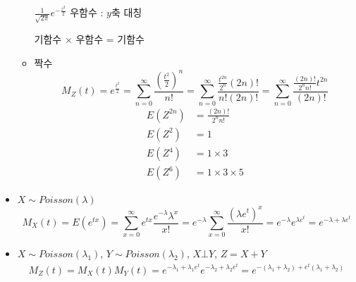 \documentclass{oblivoir}
\begin{document}
\begin{itemize}
\begin{itemize}
$\frac{1}{\sqrt{2\pi}} e^{-\frac{z^2}{2}}$ 우함수 : $y$축 대칭

기함수 $\times$ 우함수 = 기함수
\item 짝수
$$
M_Z(t) = e^{\frac{t^2}{2}} = \sum_{n=0}^{\infty} \frac{(\frac{t^2}{2})^n}{n!} = \sum_{n=0}^{\infty} \frac{\frac{t^{2n}}{2^n} (2n)!}{n!(2n)!} = \sum_{n=0}^{\infty} \frac{\frac{(2n)!}{2^nn!}t^{2n}}{(2n)!}
$$
\begin{align*}
E(Z^{2n}) &= \frac{(2n)!}{2^n n!} \\
E(Z^2) & = 1 \\
E(Z^4) & = 1 \times 3 \\
E(Z^6) & = 1 \times 3 \times 5
\end{align*}
\end{itemize}
\item $X \sim Poisson(\lambda)$
$$
M_X(t) = E(e^{tx}) = \sum_{x=0}^{\infty} e^{tx} \frac{e^{-\lambda} \lambda^x}{x!} = 
e^{-\lambda}\sum_{x=0}^{\infty} \frac{ (\lambda e^{t})^x}{x!} =
e^{-\lambda} e^{\lambda e^t} = e^{-\lambda + \lambda e^t}
$$
\item $X \sim Poisson(\lambda_1)$, $Y \sim Poisson(\lambda_2)$, $X \bot Y$, $Z = X + Y$
\begin{align*}
M_Z(t) = M_X(t) M_Y(t) = e^{-\lambda_1 + \lambda_1 e^t} e^{-\lambda_2 + \lambda_2 e^t} = e^{-(\lambda_1 + \lambda_2) + e^t (\lambda_1 + \lambda_2)}
\end{align*}
\end{itemize}
\end{document}
